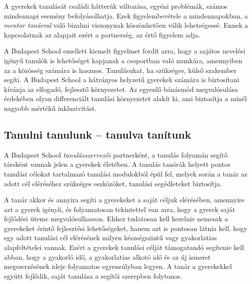 A gyerekek tanulását családi hátterük változása, egyéni problémák, számos mindennapi esemény befolyásolhatja. Ezek figyelembevétele a mindennapokban, a \emph{mentor tanárral} való bizalmi viszonynak köszönhetően válik lehetségessé. Ennek a kapcsolatnak az alapjait ezért a partnerség, az értő figyelem adja.

A Budapest School emellett kiemelt figyelmet fordít arra, hogy a sajátos nevelési igényű tanulók is lehetőséget kapjanak a csoportban való munkára, amennyiben az a közösség számára is hasznos. Tanulásukat, ha szükséges, külső szakember segíti. A Budapest School a hátrányos helyzetű gyerekek számára is biztosítani kívánja az elfogadó, fejlesztő környezetet. Az egyenlő bánásmód megvalósulása érdekében olyan differenciált tanulási környezetet alakít ki, ami biztosítja a minél nagyobb mértékű inkluzivitást.

\subsection{Tanulni tanulunk -- tanulva tanítunk}
A Budapest School \emph{tanulásszervezői} partnerként, a tanulás folyamán segítő társként vannak jelen a gyerekek életében. A tanulás tanórák helyett pontos tanulási célokat tartalmazó tanulási modulokból épül fel, melyek során a tanár az adott cél eléréséhez szükséges eszközöket, tanulási segédleteket biztosítja.

A tanár akkor és annyira segíti a gyerekeket a saját céljuk elérésében, amennyire azt a gyerek igényli, és folyamatosan tekintettel van arra, hogy a gyerek saját fejlődési üteme megvalósulhasson. Ehhez tudatosan kell kezelnie nemcsak a gyerekeket érintő fejlesztési lehetőségeket, hanem azt is pontosan látnia kell, hogy egy adott tanulási cél elérésének milyen készségszintű vagy gyakorlatias alapfeltételei vannak. Ezért a gyerekek tanulási célját támogatandó segítenie kell abban, hogy a gyakorló idő, a gyakorlatias alkotó idő és az új ismeret megszerzésének ideje folyamatos egyensúlyban legyen. A tanár a gyerekekkel együtt fejlődik, saját tanulása a segítői szerepben folytonos.
